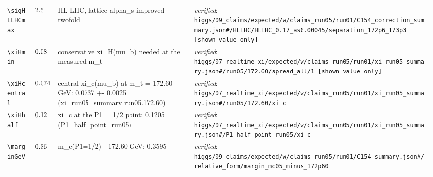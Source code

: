 {\begin{longtable}{@{}>{\raggedright\arraybackslash}p{}>{\raggedright\arraybackslash}p{}>{\raggedright\arraybackslash}p{}>{\raggedright\arraybackslash}p{}@{}}
\texttt{\textbackslash sigHLLHCmax} & $2.5$ & HL-LHC, lattice alpha\_\allowbreak{}s improved twofold & \emph{verified}: \texttt{higgs/\allowbreak{}09\_\allowbreak{}claims/\allowbreak{}expected/\allowbreak{}w/\allowbreak{}claims\_\allowbreak{}run05/\allowbreak{}run01/\allowbreak{}C154\_\allowbreak{}correction\_\allowbreak{}summary.json\#/\allowbreak{}HLLHC/\allowbreak{}HLLHC\_\allowbreak{}0.17\_\allowbreak{}as0.00045/\allowbreak{}separation\_\allowbreak{}172p6\_\allowbreak{}173p3 [shown value only]} \\
\texttt{\textbackslash xiHmin} & $0.08$ & conservative xi\_\allowbreak{}H(mu\_\allowbreak{}b) needed at the measured m\_\allowbreak{}t & \emph{verified}: \texttt{higgs/\allowbreak{}07\_\allowbreak{}realtime\_\allowbreak{}xi/\allowbreak{}expected/\allowbreak{}w/\allowbreak{}claims\_\allowbreak{}run05/\allowbreak{}run01/\allowbreak{}xi\_\allowbreak{}run05\_\allowbreak{}summary.json\#/\allowbreak{}run05/\allowbreak{}172.60/\allowbreak{}spread\_\allowbreak{}all/\allowbreak{}1 [shown value only]} \\
\texttt{\textbackslash xiHcentral} & $0.074$ & central xi\_\allowbreak{}c(mu\_\allowbreak{}b) at m\_\allowbreak{}t = 172.60 GeV: 0.0737 +- 0.0025 (xi\_\allowbreak{}run05\_\allowbreak{}summary run05.172.60) & \emph{verified}: \texttt{higgs/\allowbreak{}07\_\allowbreak{}realtime\_\allowbreak{}xi/\allowbreak{}expected/\allowbreak{}w/\allowbreak{}claims\_\allowbreak{}run05/\allowbreak{}run01/\allowbreak{}xi\_\allowbreak{}run05\_\allowbreak{}summary.json\#/\allowbreak{}run05/\allowbreak{}172.60/\allowbreak{}xi\_\allowbreak{}c} \\
\texttt{\textbackslash xiHhalf} & $0.12$ & xi\_\allowbreak{}c at the P1 = 1/\allowbreak{}2 point: 0.1205 (P1\_\allowbreak{}half\_\allowbreak{}point\_\allowbreak{}run05) & \emph{verified}: \texttt{higgs/\allowbreak{}07\_\allowbreak{}realtime\_\allowbreak{}xi/\allowbreak{}expected/\allowbreak{}w/\allowbreak{}claims\_\allowbreak{}run05/\allowbreak{}run01/\allowbreak{}xi\_\allowbreak{}run05\_\allowbreak{}summary.json\#/\allowbreak{}P1\_\allowbreak{}half\_\allowbreak{}point\_\allowbreak{}run05/\allowbreak{}xi\_\allowbreak{}c} \\
\texttt{\textbackslash marginGeV} & $0.36$ & m\_\allowbreak{}c(P1=1/\allowbreak{}2) - 172.60 GeV: 0.3595 & \emph{verified}: \texttt{higgs/\allowbreak{}09\_\allowbreak{}claims/\allowbreak{}expected/\allowbreak{}w/\allowbreak{}claims\_\allowbreak{}run05/\allowbreak{}run01/\allowbreak{}C154\_\allowbreak{}summary.json\#/\allowbreak{}relative\_\allowbreak{}form/\allowbreak{}margin\_\allowbreak{}mc05\_\allowbreak{}minus\_\allowbreak{}172p60} \\

\end{longtable}}
